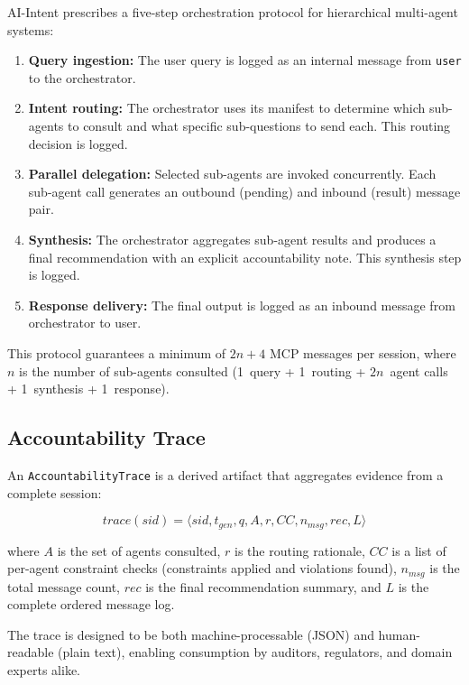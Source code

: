 \documentclass[runningheads]{llncs}
\begin{document}
AI-Intent prescribes a five-step orchestration protocol for hierarchical multi-agent systems:

\begin{enumerate}
    \item \textbf{Query ingestion:} The user query is logged as an internal message from \texttt{user} to the orchestrator.
    \item \textbf{Intent routing:} The orchestrator uses its manifest to determine which sub-agents to consult and what specific sub-questions to send each. This routing decision is logged.
    \item \textbf{Parallel delegation:} Selected sub-agents are invoked concurrently. Each sub-agent call generates an outbound (pending) and inbound (result) message pair.
    \item \textbf{Synthesis:} The orchestrator aggregates sub-agent results and produces a final recommendation with an explicit accountability note. This synthesis step is logged.
    \item \textbf{Response delivery:} The final output is logged as an inbound message from orchestrator to user.
\end{enumerate}

This protocol guarantees a minimum of $2n + 4$ MCP messages per session, where $n$ is the number of sub-agents consulted (1~query + 1~routing + $2n$~agent calls + 1~synthesis + 1~response).

\subsection{Accountability Trace}
\label{sec:trace}

An \texttt{AccountabilityTrace} is a derived artifact that aggregates evidence from a complete session:

\begin{equation}
\mathit{trace}(\mathit{sid}) = \langle \mathit{sid}, t_{\mathit{gen}}, q, A, r, \mathit{CC}, n_{\mathit{msg}}, \mathit{rec}, L \rangle
\end{equation}

\noindent where $A$ is the set of agents consulted, $r$ is the routing rationale, $\mathit{CC}$ is a list of per-agent constraint checks (constraints applied and violations found), $n_{\mathit{msg}}$ is the total message count, $\mathit{rec}$ is the final recommendation summary, and $L$ is the complete ordered message log.

The trace is designed to be both machine-processable (JSON) and human-readable (plain text), enabling consumption by auditors, regulators, and domain experts alike.
\end{document}
